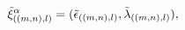 \begin{equation}
\tilde{\xi}_{((m,n),l)}^{\alpha }=(\tilde{\epsilon}_{((m,n),l)},\tilde{%
\lambda}_{((m,n),l)}),  \label{param9}
\end{equation}

